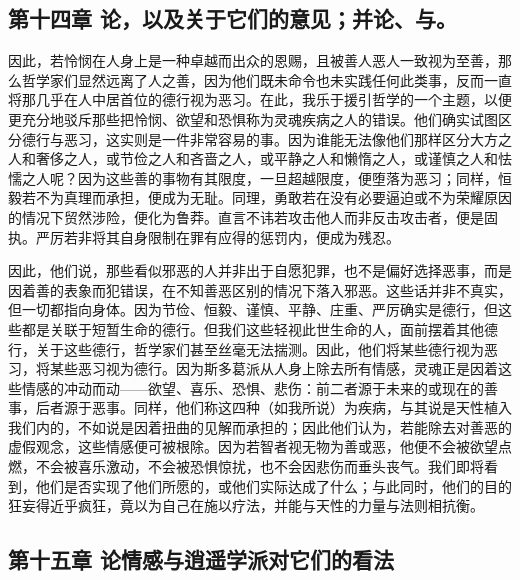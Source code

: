 \subsection{第十四章  论，以及关于它们的意见；并论、与。}

因此，若怜悯在人身上是一种卓越而出众的恩赐，且被善人恶人一致视为至善，那么哲学家们显然远离了人之善，因为他们既未命令也未实践任何此类事，反而一直将那几乎在人中居首位的德行视为恶习。在此，我乐于援引哲学的一个主题，以便更充分地驳斥那些把怜悯、欲望和恐惧称为灵魂疾病之人的错误。他们确实试图区分德行与恶习，这实则是一件非常容易的事。因为谁能无法像他们那样区分大方之人和奢侈之人，或节俭之人和吝啬之人，或平静之人和懒惰之人，或谨慎之人和怯懦之人呢？因为这些善的事物有其限度，一旦超越限度，便堕落为恶习；同样，恒毅若不为真理而承担，便成为无耻。同理，勇敢若在没有必要逼迫或不为荣耀原因的情况下贸然涉险，便化为鲁莽。直言不讳若攻击他人而非反击攻击者，便是固执。严厉若非将其自身限制在罪有应得的惩罚内，便成为残忍。\par

因此，他们说，那些看似邪恶的人并非出于自愿犯罪，也不是偏好选择恶事，而是因着善的表象而犯错误，在不知善恶区别的情况下落入邪恶。这些话并非不真实，但一切都指向身体。因为节俭、恒毅、谨慎、平静、庄重、严厉确实是德行，但这些都是关联于短暂生命的德行。但我们这些轻视此世生命的人，面前摆着其他德行，关于这些德行，哲学家们甚至丝毫无法揣测。因此，他们将某些德行视为恶习，将某些恶习视为德行。因为斯多葛派从人身上除去所有情感，灵魂正是因着这些情感的冲动而动——欲望、喜乐、恐惧、悲伤：前二者源于未来的或现在的善事，后者源于恶事。同样，他们称这四种（如我所说）为疾病，与其说是天性植入我们内的，不如说是因着扭曲的见解而承担的；因此他们认为，若能除去对善恶的虚假观念，这些情感便可被根除。因为若智者视无物为善或恶，他便不会被欲望点燃，不会被喜乐激动，不会被恐惧惊扰，也不会因悲伤而垂头丧气。我们即将看到，他们是否实现了他们所愿的，或他们实际达成了什么；与此同时，他们的目的狂妄得近乎疯狂，竟以为自己在施以疗法，并能与天性的力量与法则相抗衡。\par


\subsection{第十五章 论情感与逍遥学派对它们的看法}

